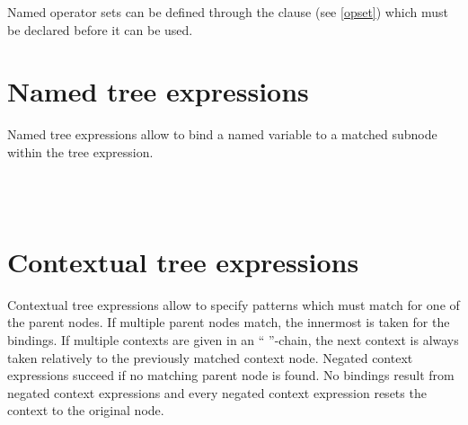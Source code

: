 \noindent
Named operator sets can be defined through the  clause
(see \ref{opset}) which must be declared before it can be used.

\section{Named tree expressions}

Named tree expressions allow to bind a named variable to a
matched subnode within the tree expression.

\begin{grammar}
      \produces {} \\
      \produces {} 
	  \\
\end{grammar}

\section{Contextual tree expressions}

Contextual tree expressions allow to specify patterns which must
match for one of the parent nodes. If multiple parent nodes match,
the innermost is taken for the bindings. If multiple contexts
are given in an `` ''-chain, the
next context is always taken relatively to the previously matched context node.
Negated context expressions succeed if no matching parent node is
found. No bindings result from negated context expressions and
every negated context expression resets the context to the original node.

\begin{grammar}
      \produces {} \\
      \produces {}
	   \\
      \produces {}
	 \lextoken{!}   \\
      \produces {} \\
      \produces {}
	    \\
      \produces {}
	  \lextoken{!} 
	  \\
      \produces {} \\
\end{grammar}

